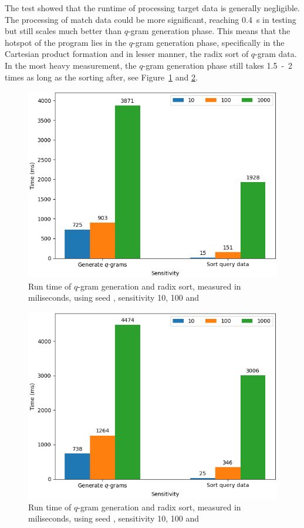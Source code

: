 \documentclass[twoside,a4paper,bsc]{master}
\newcommand{\Qgram}[1]{\(#1\)-gram}
\begin{document}
The test showed that the runtime of processing target data is generally
negligible. The processing of match data could be more significant,
reaching
0.4~s in testing but still scales much better than \Qgram{q} generation
phase.
This means that the hotspot of the program lies in the \Qgram{q} generation
phase, specifically in the Cartesian product formation and in lesser
manner,
the radix sort of \Qgram{q} data. In the most heavy measurement, the
\Qgram{q}
generation phase still takes 1.5~-~2 times as long as the sorting after,
see
Figure~\ref{fig:hotspot_w6} and \ref{fig:hotspot_w7}.
\begin{figure}
\centering
\includegraphics[scale=0.6]{graphics/hotspot_w6.png}
\caption{Run time of \Qgram{q} generation and radix sort, measured in
miliseconds,
using seed , sensitivity 10, 100 and }
\label{fig:hotspot_w6}
\end{figure}
\begin{figure}
\centering
\includegraphics[scale=0.6]{graphics/hotspot_w7.png}
\caption{Run time of \Qgram{q} generation and radix sort, measured in
miliseconds,
using seed , sensitivity 10, 100 and }
\label{fig:hotspot_w7}
\end{figure}
\end{document}
